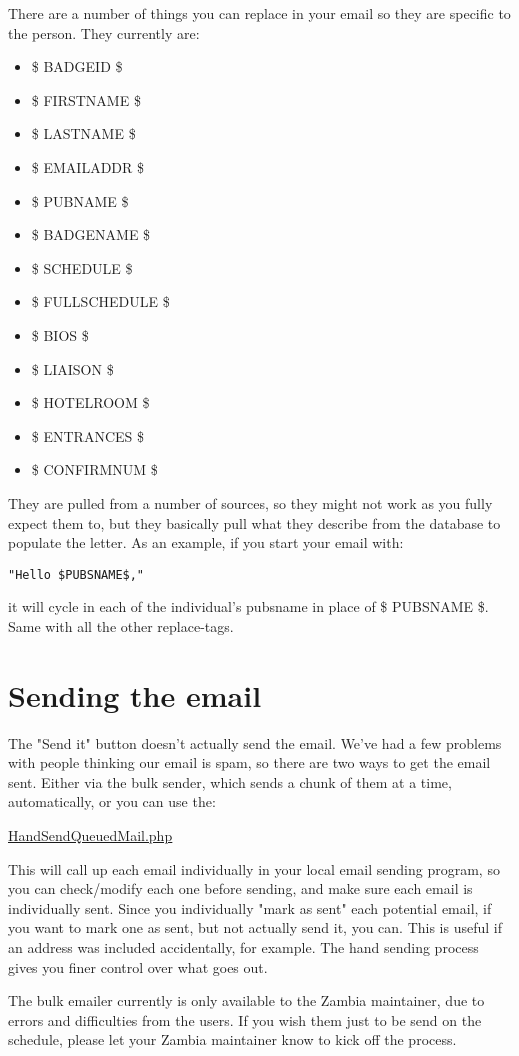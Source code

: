 \documentclass[captions=tablesignature]{scrartcl}
\begin{document}
There are a number of things you can replace in your email so they
are specific to the person.  They currently are:
\begin{itemize}
\item \$ BADGEID \$
\item \$ FIRSTNAME \$
\item \$ LASTNAME \$
\item \$ EMAILADDR \$
\item \$ PUBNAME \$
\item \$ BADGENAME \$
\item \$ SCHEDULE \$
\item \$ FULLSCHEDULE \$
\item \$ BIOS \$
\item \$ LIAISON \$
\item \$ HOTELROOM \$
\item \$ ENTRANCES \$
\item \$ CONFIRMNUM \$
\end{itemize}

They are pulled from a number of sources, so they might not work
as you fully expect them to, but they basically pull what they
describe from the database to populate the letter.
As an example, if you start your email with:
\begin{verbatim}
"Hello $PUBSNAME$,"
\end{verbatim}
it will cycle in each of the individual's
pubsname in place of \$ PUBSNAME \$.  Same with all the other
replace-tags.

\section{Sending the email}
\label{sec-7}

The "Send it" button doesn't actually send the email.  We've had a
few problems with people thinking our email is spam, so there are
two ways to get the email sent.  Either via the bulk sender, which
sends a chunk of them at a time, automatically, or you can use the:

\label{HandSendQueuedMail.php}
\underline{
\href{../webpages/HandSendQueuedMail.php}{HandSendQueuedMail.php}
}

This will call up each email individually in your local email
sending program, so you can check/modify each one before sending,
and make sure each email is individually sent. Since you
individually "mark as sent" each potential email, if you want to
mark one as sent, but not actually send it, you can. This is useful
if an address was included accidentally, for example. The hand
sending process gives you finer control over what goes out.

The bulk emailer currently is only available to the Zambia
maintainer, due to errors and difficulties from the users.  If you
wish them just to be send on the schedule, please let your Zambia
maintainer know to kick off the process.
\end{document}
